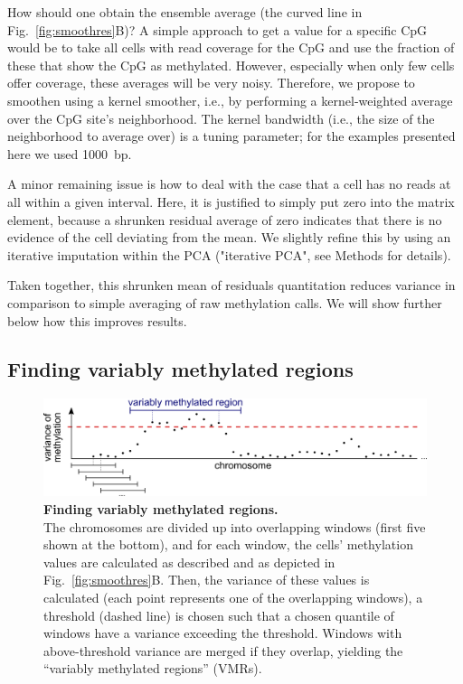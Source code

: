 \documentclass[twocolumn,10pt]{article}
\newcommand{\new}[1]{#1} %
\begin{document}
How should one obtain the ensemble average (the curved line in Fig.~\ref{fig:smoothres}B)?
A simple approach to get a value for a specific CpG would be to take all cells with read coverage for the CpG and use the fraction of these that show the CpG as methylated.
However, especially when only few cells offer coverage, these averages will be very noisy.
Therefore, we propose to smoothen using a kernel smoother, i.e., by performing a kernel-weighted average over the CpG site's neighborhood.
The kernel bandwidth (i.e., the size of the neighborhood to average over) is a tuning parameter; for the examples presented here we used 1000~bp.

A minor remaining issue is how to deal with the case that a cell has no reads at all within a given interval.
Here, it is justified to simply put zero into the matrix element, because a shrunken residual average of zero indicates that there is no evidence of the cell deviating from the mean.
We slightly refine this by using an iterative imputation within the PCA (\new{"iterative PCA"}, see Methods for details).

Taken together, this shrunken mean of residuals quantitation reduces variance in comparison to simple averaging of raw methylation calls.
We will show further below how this improves results.

\subsection{Finding variably methylated regions}

\begin{figure}
    \begin{center}
    \includegraphics[width=\columnwidth]{figures/Fig_sliding.png}
    \end{center}
    \caption{\small \textbf{Finding variably methylated regions.}\\
    The chromosomes are divided up into overlapping windows (first five shown at the bottom), and for each window, the cells' methylation values are calculated as described and as depicted in Fig.~\ref{fig:smoothres}B.
    Then, the variance of these values is calculated (each point represents one of the overlapping windows), a threshold (dashed line) is chosen such that a chosen quantile of windows have a variance exceeding the threshold.
    Windows with above-threshold variance are merged if they overlap, yielding the ``variably methylated regions'' (VMRs).}
    \label{fig:vmr}
\end{figure}
\end{document}
